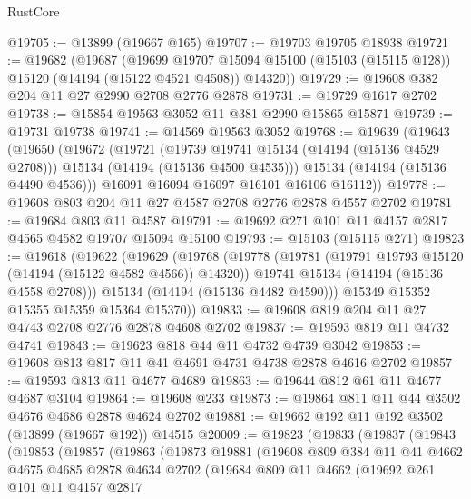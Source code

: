 \begin{lexlean}{RustCore}
\begin{coremodule}
@19705 := @13899 (@19667 @165)
@19707 := @19703 @19705 @18938
@19721 := @19682
    (@19687
      (@19699
        @19707
        @15094
        @15100
        (@15103 (@15115 @128))
        @15120
        (@14194 (@15122 @4521 @4508))
        @14320))
@19729 := @19608 @382 @204 @11 @27 @2990 @2708 @2776 @2878
@19731 := @19729 @1617 @2702
@19738 := @15854 @19563 @3052 @11 @381 @2990 @15865 @15871
@19739 := @19731 @19738
@19741 := @14569 @19563 @3052
@19768 := @19639
    (@19643
      (@19650
        (@19672
          (@19721
            (@19739 @19741 @15134 (@14194 (@15136 @4529 @2708)))
            @15134
            (@14194 (@15136 @4500 @4535)))
          @15134
          (@14194 (@15136 @4490 @4536)))
        @16091
        @16094
        @16097
        @16101
        @16106
        @16112))
@19778 := @19608 @803 @204 @11 @27 @4587 @2708 @2776 @2878 @4557 @2702
@19781 := @19684 @803 @11 @4587
@19791 := @19692 @271 @101 @11 @4157 @2817 @4565 @4582 @19707 @15094 @15100
@19793 := @15103 (@15115 @271)
@19823 := @19618
    (@19622
      (@19629
        (@19768
          (@19778
            (@19781 (@19791 @19793 @15120 (@14194 (@15122 @4582 @4566)) @14320))
            @19741
            @15134
            (@14194 (@15136 @4558 @2708)))
          @15134
          (@14194 (@15136 @4482 @4590)))
        @15349
        @15352
        @15355
        @15359
        @15364
        @15370))
@19833 := @19608 @819 @204 @11 @27 @4743 @2708 @2776 @2878 @4608 @2702
@19837 := @19593 @819 @11 @4732 @4741
@19843 := @19623 @818 @44 @11 @4732 @4739 @3042
@19853 := @19608 @813 @817 @11 @41 @4691 @4731 @4738 @2878 @4616 @2702
@19857 := @19593 @813 @11 @4677 @4689
@19863 := @19644 @812 @61 @11 @4677 @4687 @3104
@19864 := @19608 @233
@19873 := @19864 @811 @11 @44 @3502 @4676 @4686 @2878 @4624 @2702
@19881 := @19662 @192 @11 @192 @3502 (@13899 (@19667 @192)) @14515
@20009 := @19823
    (@19833
      (@19837
        (@19843
          (@19853
            (@19857
              (@19863
                (@19873
                  @19881
                  (@19608
                    @809
                    @384
                    @11
                    @41
                    @4662
                    @4675
                    @4685
                    @2878
                    @4634
                    @2702
                    (@19684
                      @809
                      @11
                      @4662
                      (@19692
                        @261
                        @101
                        @11
                        @4157
                        @2817

\end{coremodule}
\end{lexlean}
